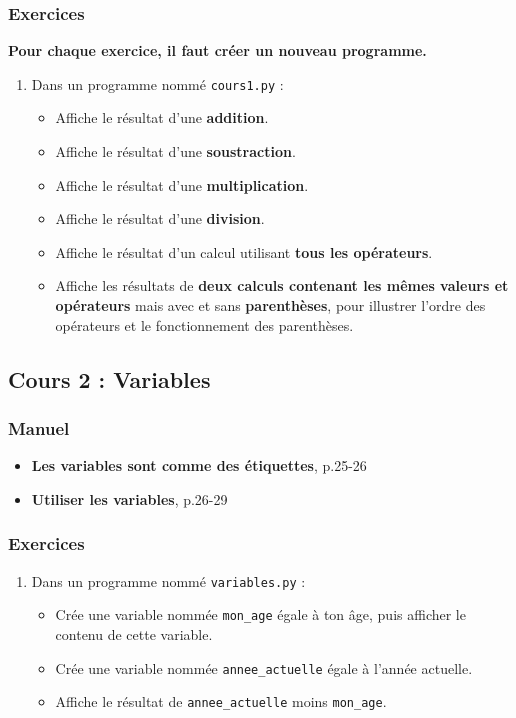\documentclass[11pt]{article}
\begin{document}
\subsubsection*{Exercices}
\label{sec:org3bb3f5b}
\textbf{Pour chaque exercice, il faut créer un nouveau programme.}
\begin{enumerate}
\item Dans un programme nommé \texttt{cours1.py} :
\begin{itemize}
\item Affiche le résultat d'une \textbf{addition}.
\item Affiche le résultat d'une \textbf{soustraction}.
\item Affiche le résultat d'une \textbf{multiplication}.
\item Affiche le résultat d'une \textbf{division}.
\item Affiche le résultat d'un calcul utilisant \textbf{tous les opérateurs}.
\item Affiche les résultats de \textbf{deux calculs contenant les mêmes valeurs et opérateurs} mais avec et sans \textbf{parenthèses}, pour illustrer l'ordre des opérateurs et le fonctionnement des parenthèses.
\end{itemize}
\end{enumerate}

\subsection*{Cours 2 : Variables}
\label{chapitre1_cours2}
\subsubsection*{Manuel}
\label{sec:orgefde112}
\begin{itemize}
\item \textbf{\og Les variables sont comme des étiquettes\fg{}}, p.25-26
\item \textbf{\og Utiliser les variables\fg{}}, p.26-29
\end{itemize}
\subsubsection*{Exercices}
\label{sec:org2f77dd9}
\begin{enumerate}
\item Dans un programme nommé \texttt{variables.py} :
\begin{itemize}
\item Crée une variable nommée \texttt{mon\_age} égale à ton âge, puis afficher le contenu de cette variable.
\item Crée une variable nommée \texttt{annee\_actuelle} égale à l'année actuelle.
\item Affiche le résultat de \texttt{annee\_actuelle} moins \texttt{mon\_age}.
\end{itemize}
\end{enumerate}
\end{document}
